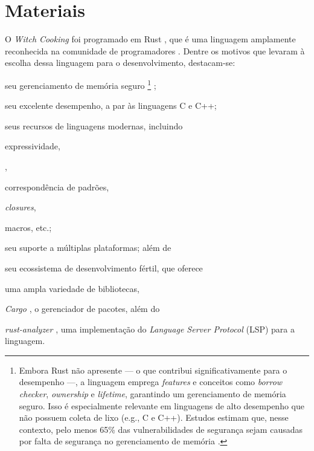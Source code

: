 \documentclass
  [11pt,a4paper,english,brazil,openright,sumario=tradicional,twoside]
  {abntex2}
\newcommand{\witchcooking}{\textit{Witch Cooking}\xspace}
\begin{document}

  \section{Materiais}

  O \witchcooking foi programado em Rust \cite{rust-2023-rust}, que é uma
  linguagem amplamente reconhecida na comunidade de programadores
  \cite{stack-overflow-2023-stack}. Dentre os motivos que levaram à escolha
  dessa linguagem para o desenvolvimento, destacam-se:
  \begin{inparaenum}
    \item seu gerenciamento de memória seguro%
          \footnote
            { Embora Rust não apresente \textit{} ---
              o que contribui significativamente para o desempenho ---, a
              linguagem emprega \textit{features} e conceitos como
              \textit{borrow checker}, \textit{ownership} e \textit{lifetime},
              garantindo um gerenciamento de memória seguro. Isso é
              especialmente relevante em linguagens de alto desempenho que não
              possuem coleta de lixo (e.g., C e C++). Estudos estimam que,
              nesse contexto, pelo menos 65\% das vulnerabilidades de segurança
              sejam causadas por falta de segurança no gerenciamento de memória
              \cite{gaynor-2020-what}.}
          \cite[3]{nsa-2022-software};
    \item seu excelente desempenho, a par às linguagens C e C++;
    \item seus recursos de linguagens modernas, incluindo
          \begin{inparaenum}
            \item expressividade,
            \item \textit{},
            \item correspondência de padrões,
            \item \textit{closures},
            \item macros, etc.;
          \end{inparaenum}
    \item seu suporte a múltiplas plataformas; além de
    \item seu ecossistema de desenvolvimento fértil, que oferece
          \begin{inparaenum}
            \item uma ampla variedade de bibliotecas,
            \item \textit{Cargo} \cite{rust-2023-cargo}, o gerenciador de
                  pacotes, além do
            \item \textit{rust-analyzer} \cite{rust-analyzer-2023-rust}, uma
                  implementação do \textit{Language Server Protocol} (LSP) para
                  a linguagem.
          \end{inparaenum}
  \end{inparaenum}
\end{document}
